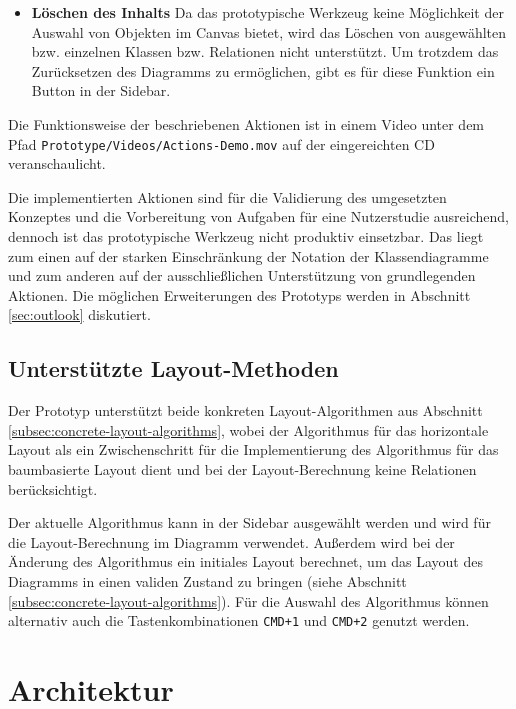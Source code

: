 \begin{itemize}
\item
\textbf{Löschen des Inhalts}
Da das prototypische Werkzeug keine Möglichkeit der Auswahl von Objekten im Canvas bietet, wird das Löschen von ausgewählten bzw. einzelnen Klassen bzw. Relationen nicht unterstützt. Um trotzdem das Zurücksetzen des Diagramms zu ermöglichen, gibt es für diese Funktion ein Button in der Sidebar.

\end{itemize}

Die Funktionsweise der beschriebenen Aktionen ist in einem Video unter dem Pfad \texttt{Proto\-type/Videos/Actions-Demo.mov} auf der eingereichten CD veranschaulicht.

Die implementierten Aktionen sind für die Validierung des umgesetzten Konzeptes und die Vorbereitung von Aufgaben für eine Nutzerstudie ausreichend, dennoch ist das prototypische Werkzeug nicht produktiv einsetzbar. Das liegt zum einen auf der starken Einschränkung der Notation der Klassendiagramme und zum anderen auf der ausschließlichen Unterstützung von grundlegenden Aktionen. Die möglichen Erweiterungen des Prototyps werden in Abschnitt \ref{sec:outlook} diskutiert.

\subsection{Unterstützte Layout-Methoden}
\label{subsec:supported-layout-methods}

Der Prototyp unterstützt beide konkreten Layout-Algorithmen aus Abschnitt \ref{subsec:concrete-layout-algorithms}, wobei der Algorithmus für das horizontale Layout als ein Zwischenschritt für die Implementierung des Algorithmus für das baumbasierte Layout dient und bei der Layout-Berechnung keine Relationen berücksichtigt.

Der aktuelle Algorithmus kann in der Sidebar ausgewählt werden und wird für die Layout-Berechnung im Diagramm verwendet. Außerdem wird bei der Änderung des Algorithmus ein initiales Layout berechnet, um das Layout des Diagramms in einen validen Zustand zu bringen (siehe Abschnitt \ref{subsec:concrete-layout-algorithms}). Für die Auswahl des Algorithmus können alternativ auch die Tastenkombinationen \texttt{CMD+1} und \texttt{CMD+2} genutzt werden.

\section{Architektur}
\label{sec:architecture}

